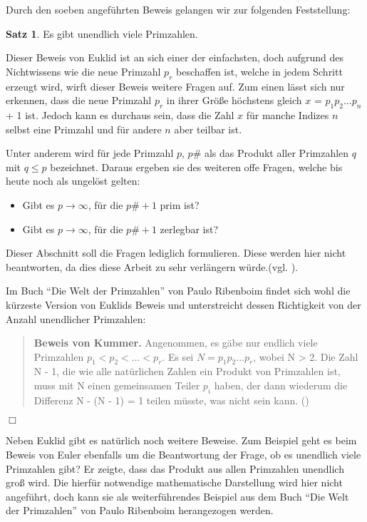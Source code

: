 \documentclass[12pt,a4paper]{article}
\theoremstyle{definition}
\newtheorem{satz}{Satz}[subsection]
\begin{document}
Durch den soeben angeführten Beweis gelangen wir zur folgenden Feststellung:
\begin{satz}Es gibt unendlich viele Primzahlen.\end{satz}

Dieser Beweis von Euklid ist an sich einer der einfachsten, doch aufgrund des Nichtwissens wie die neue Primzahl $p_r$ beschaffen ist, welche in jedem Schritt erzeugt wird, wirft dieser Beweis weitere Fragen auf.
Zum einen lässt sich nur erkennen, dass die neue Primzahl $p_r$ in ihrer Größe höchstens gleich\newline
$x$ = $p_1p_2...p_n$ + 1 ist. Jedoch kann es durchaus sein, dass die Zahl $x$ für manche Indizes $n$ selbst eine Primzahl und für andere $n$ aber teilbar ist.

Unter anderem wird für jede Primzahl $p$, $p\#$ als das Produkt aller Primzahlen $q$ mit $q \leq p$ bezeichnet. 
Daraus ergeben sie des weiteren offe Fragen, welche bis heute noch als ungelöst gelten:
\begin{itemize}
    \item Gibt es $p \to \infty$, für die $p\# +1$ prim ist?
    \item Gibt es $p \to \infty$, für die $p\# +1$ zerlegbar ist?
\end{itemize}
Dieser Abschnitt soll die Fragen lediglich formulieren.
Diese werden hier nicht beantworten, da dies diese Arbeit zu sehr verlängern würde.(vgl. \cite[4]{Ribenboim2006}).

Im Buch “Die Welt der Primzahlen” von Paulo Ribenboim findet sich wohl die kürzeste Version von Euklids Beweis und unterstreicht dessen Richtigkeit von der Anzahl unendlicher Primzahlen:

\begin{quote}
\small
\textbf{Beweis von Kummer.} Angenommen, es gäbe nur endlich viele Primzahlen $p_1 < p_2 <...< p_r$.
Es sei $N = p_1p_2...p_r$, wobei N > 2.
Die Zahl N - 1, die wie alle natürlichen Zahlen ein Produkt von Primzahlen ist, muss mit N einen gemeinsamen Teiler $p_i$ haben, der dann wiederum die Differenz N - (N - 1) = 1 teilen müsste, was nicht sein kann. (\cite[4]{Ribenboim2006})
\end{quote}
\begin{flushright}
$\Box$
\end{flushright}

Neben Euklid gibt es natürlich noch weitere Beweise.
Zum Beispiel geht es beim Beweis von Euler ebenfalls um die Beantwortung der Frage, ob es unendlich viele Primzahlen gibt?
Er zeigte, dass das Produkt aus allen Primzahlen unendlich groß wird.
Die hierfür notwendige mathematische Darstellung wird hier nicht angeführt, doch kann sie als weiterführendes Beispiel aus dem Buch “Die Welt der Primzahlen” von Paulo Ribenboim herangezogen werden.
\end{document}
